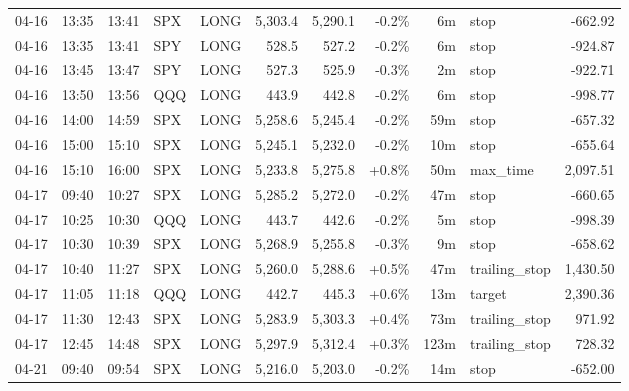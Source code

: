 \documentclass[11pt,a4paper,twoside]{article}
\begin{document}
\begin{center}
\begin{longtable}{>{\color{txtmain}}l l l l l r r r r >{\color{txtmain}}l r}
04-16 & 13:35 & 13:41 & SPX & LONG & 5,303.4 & 5,290.1 & \textcolor{lossred}{-0.2\%} & 6m & stop & \textcolor{lossred}{-662.92} \\
04-16 & 13:35 & 13:41 & SPY & LONG & 528.5 & 527.2 & \textcolor{lossred}{-0.2\%} & 6m & stop & \textcolor{lossred}{-924.87} \\
04-16 & 13:45 & 13:47 & SPY & LONG & 527.3 & 525.9 & \textcolor{lossred}{-0.3\%} & 2m & stop & \textcolor{lossred}{-922.71} \\
04-16 & 13:50 & 13:56 & QQQ & LONG & 443.9 & 442.8 & \textcolor{lossred}{-0.2\%} & 6m & stop & \textcolor{lossred}{-998.77} \\
04-16 & 14:00 & 14:59 & SPX & LONG & 5,258.6 & 5,245.4 & \textcolor{lossred}{-0.2\%} & 59m & stop & \textcolor{lossred}{-657.32} \\
04-16 & 15:00 & 15:10 & SPX & LONG & 5,245.1 & 5,232.0 & \textcolor{lossred}{-0.2\%} & 10m & stop & \textcolor{lossred}{-655.64} \\
04-16 & 15:10 & 16:00 & SPX & LONG & 5,233.8 & 5,275.8 & \textcolor{wingreen}{+0.8\%} & 50m & max\_time & \textcolor{wingreen}{2,097.51} \\
04-17 & 09:40 & 10:27 & SPX & LONG & 5,285.2 & 5,272.0 & \textcolor{lossred}{-0.2\%} & 47m & stop & \textcolor{lossred}{-660.65} \\
04-17 & 10:25 & 10:30 & QQQ & LONG & 443.7 & 442.6 & \textcolor{lossred}{-0.2\%} & 5m & stop & \textcolor{lossred}{-998.39} \\
04-17 & 10:30 & 10:39 & SPX & LONG & 5,268.9 & 5,255.8 & \textcolor{lossred}{-0.3\%} & 9m & stop & \textcolor{lossred}{-658.62} \\
04-17 & 10:40 & 11:27 & SPX & LONG & 5,260.0 & 5,288.6 & \textcolor{wingreen}{+0.5\%} & 47m & trailing\_stop & \textcolor{wingreen}{1,430.50} \\
04-17 & 11:05 & 11:18 & QQQ & LONG & 442.7 & 445.3 & \textcolor{wingreen}{+0.6\%} & 13m & target & \textcolor{wingreen}{2,390.36} \\
04-17 & 11:30 & 12:43 & SPX & LONG & 5,283.9 & 5,303.3 & \textcolor{wingreen}{+0.4\%} & 73m & trailing\_stop & \textcolor{wingreen}{971.92} \\
04-17 & 12:45 & 14:48 & SPX & LONG & 5,297.9 & 5,312.4 & \textcolor{wingreen}{+0.3\%} & 123m & trailing\_stop & \textcolor{wingreen}{728.32} \\
04-21 & 09:40 & 09:54 & SPX & LONG & 5,216.0 & 5,203.0 & \textcolor{lossred}{-0.2\%} & 14m & stop & \textcolor{lossred}{-652.00} \\

\end{longtable}
\end{center}
\end{document}
